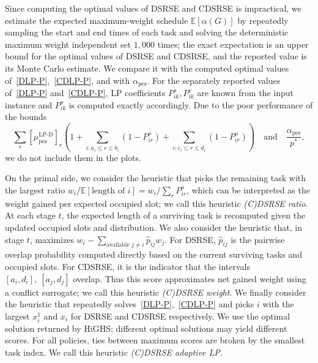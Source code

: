 \documentclass{article}
\newcommand{\E}{\mathbb{E}}
\DeclareMathOperator{\pes}{pes}
\begin{document}
Since computing the optimal values of DSRSE and {CDSRSE }is impractical, we estimate the expected maximum-weight schedule $\E[\alpha(G)]$ by repeatedly sampling the start and end times of each task and solving the deterministic maximum weight independent set $1,000$ times; {the exact expectation }is an upper bound for the optimal values of DSRSE and CDSRSE{\unskip, and the reported value is its Monte Carlo estimate}.
We compare it with the {computed optimal }values of~\eqref{DLP-P},~\eqref{CDLP-P}, and with $\alpha_{\pes}$.
{For the separately reported values of~\eqref{DLP-P} and~\eqref{CDLP-P}, LP coefficients $P_{ik}^s,P_{ik}^e$ are known from the input instance and $P_{ik}^o$ is computed exactly accordingly.}
Due to the poor performance of the bounds
\[
  \sum_r[\mu_{\pes}^{\operatorname{LP-D}}]_r\left(
    1+\sum_{i:{a_i\leq r\leq b_i}}(1-P_{ir}^o)
  +\sum_{i:{c_i\leq r\leq d_i}}(1-P_{ir}^o)\right)
  \quad\text{and}\quad\frac{\alpha_{\pes}}{p^*},
\]
we do not include them in the plots.

On the primal side, we consider the heuristic that picks the remaining task with the largest ratio $w_i/\E[\text{length of }i]=w_i/\sum_r P_{ir}^o$, which can be interpreted as the weight gained per expected occupied slot; we call this heuristic \emph{(C)DSRSE ratio}.
{At each stage $t$, the expected length of a surviving task is recomputed given the updated occupied slots and distribution.}
We also consider the heuristic that, in stage $t$, maximizes {$w_i-\sum_{\text{available }j\neq i}\widehat p_{ij}w_j$. For DSRSE, $\widehat p_{ij}$ is the pairwise overlap probability computed directly based on the current surviving tasks and occupied slots. For CDSRSE, it is the indicator that the intervals $[a_i,d_i],~[a_j,d_j]$ overlap. Thus this score approximates }net gained weight {using a conflict surrogate}; we call this heuristic \emph{(C)DSRSE weight}.
We finally consider the heuristic that repeatedly solves~\eqref{DLP-P},~\eqref{CDLP-P} and picks $i$ with the largest $x_i^1$ and $x_i$ for DSRSE and CDSRSE respectively. 
We use the optimal solution returned by HiGHS; different optimal solutions may yield different scores.
For all policies, ties between maximum scores are broken by the
smallest task index.
We call this heuristic \emph{(C)DSRSE adaptive LP.}
\end{document}
